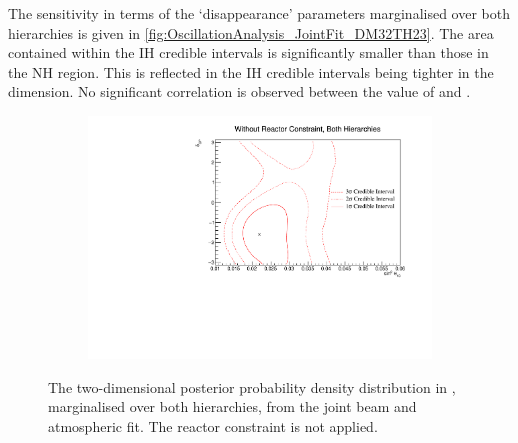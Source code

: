 The sensitivity in terms of the `disappearance' parameters marginalised over both hierarchies is given in \autoref{fig:OscillationAnalysis_JointFit_DM32TH23}. The area contained within the IH credible intervals is significantly smaller than those in the NH region. This is reflected in the IH credible intervals being tighter in the  dimension. No significant correlation is observed between the value of  and .

\begin{figure}[h]
  \begin{subfigure}[t]{0.95\textwidth}
    \includegraphics[width=\textwidth, trim={0mm 0mm 0mm 0mm}, clip,page=1]{Figures/OA/JointFit/Contours_2D_th13_dcp_BH_1_woRC_UnSmeared_CredibleInterval.pdf}
  \end{subfigure}
  \caption{The two-dimensional posterior probability density distribution in , marginalised over both hierarchies, from the joint beam and atmospheric fit. The reactor constraint is not applied.}
  \label{fig:OscillationAnalysis_JointFit_DCPTH13}
\end{figure}

